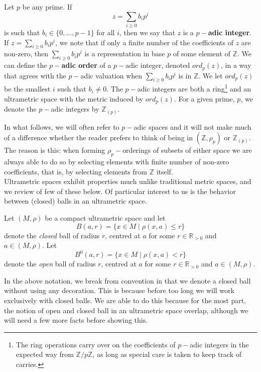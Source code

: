 \begin{example}
Let $p$ be any prime. If 
\[z = \sum_{i \geq 0} b_ip^i\]
is such that $b_i \in \{0,\ldots,p-1\}$ for all $i$, then we say that $z$ is a \textbf{$p-$adic integer}. If $z = \sum_{i \geq 0} b_ip^i$, we note that if only a finite number of the coefficients of $z$ are non-zero, then $\sum_{i \geq 0} b_ip^i$ is a representation in base $p$ of some element of $\mathbb{Z}$. We can define the \textbf{$p-$adic order} of a $p-$adic integer, denoted $ord_p(z)$, in a way that agrees with the $p-$adic valuation when $\sum_{i \geq 0} b_ip^i$ is in $\mathbb{Z}$. We let $ord_p(z)$ be the smallest $i$ such that $b_i \neq 0$. The $p-$adic integers are both a ring\footnote{The ring operations carry over on the coefficients of $p-$adic integers in the expected way from $\mathbb{Z}/p\mathbb{Z}$, as long as special care is taken to keep track of carries.} and an ultrametric space with the metric induced by $ord_p(z)$. For a given prime, $p$, we denote the $p-$adic integers by $\mathbb{Z}_{(p)}$.
\end{example} 

In what follows, we will often refer to $p-$adic spaces and it will not make much of a difference whether the reader prefers to think of being in $(\mathbb{Z}, \rho_p)$ or $\mathbb{Z}_{(p)}$. The reason is this: when forming $\rho_p-$orderings of subsets of either space we are always able to do so by selecting elements with finite number of non-zero coefficients, that is, by selecting elements from $\mathbb{Z}$ itself. \\

Ultrametric spaces exhibit properties much unlike traditional metric spaces, and we review of few of these below. Of particular interest to us is the behavior between (closed) balls in an ultrametric space. \\

\begin{notation*}
	Let $(M, \rho)$ be a compact ultrametric space and let \[B(a, r)=\{x \in M \mid \rho(x,a) \leq r\}\] denote the \textit{closed} ball of radius $r$, centred at $a$ for some $r \in \mathbb{R}_{> 0}$ and $a \in (M,\rho)$. Let \[B^0(a, r)=\{x \in M \mid \rho(x,a) < r\}\] denote the \textit{open} ball of radius $r$, centred at $a$ for some $r \in \mathbb{R}_{> 0}$ and $a \in (M,\rho)$.
\end{notation*} 


In the above notation, we break from  convention in that we denote a closed ball without using any decoration. This is because before too long we will work exclusively with closed balls.  We are able to do this because for the most part, the notion of open and closed ball in an ultrametric space overlap, although we will need a few more facts before showing this.\\

